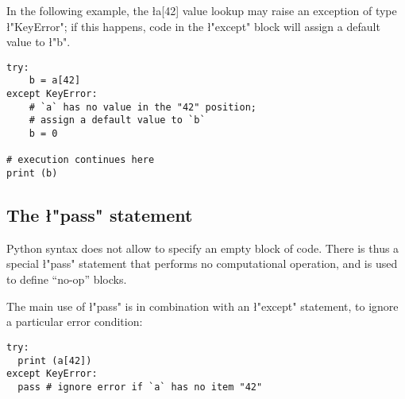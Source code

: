 In the following example, the \l{a[42]} value lookup may
raise an exception of type \l"KeyError"; if this happens,
code in the \l"except" block will assign a default value to
\l"b".
\begin{lstlisting}
try:
    b = a[42]
except KeyError:
    # `a` has no value in the "42" position; 
    # assign a default value to `b`
    b = 0

# execution continues here
print (b)
\end{lstlisting}
                          

\subsection{The {\l"pass"} statement}
\label{sec:pass}

Python syntax does not allow to specify an empty block of code. There
is thus a special \l"pass" statement that performs no
computational operation, and is used to define ``no-op'' blocks.

The main use of \l"pass" is in combination with an
\l"except" statement, to ignore a particular error condition:
\begin{lstlisting}
try:
  print (a[42])
except KeyError:
  pass # ignore error if `a` has no item "42"
\end{lstlisting}



